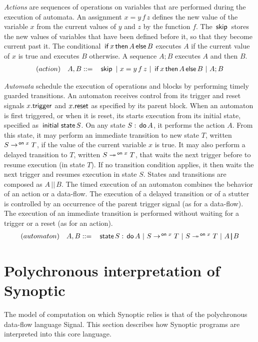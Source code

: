 \documentclass[copyright,creativecommons]{eptcs}
\newcommand{\signal}{{\sc Signal}}
\newcommand{\op}[1]{{\sf #1}}
\newcommand{\kw}[1]{{{\,\op{#1}\,}}}
\newcommand{\Par}{{\,|\!\!|\,}}
\newcommand{\ra}{\rightarrow}
\renewcommand{\:}{{:}}
\newcommand{\Do}{{\kw{do}}}
\newcommand{\Skip}{{\kw{skip}}}
\newcommand{\If}{{\kw{if}}}
\newcommand{\Then}{{\kw{then}}}
\newcommand{\Else}{{\kw{else}}}
\newcommand{\trigger}{{\op{trigger}}}
\newcommand{\reset}{{\op{reset}}}
\newcommand{\rra}{\twoheadrightarrow}
\newcommand{\Init}{{\kw{initial}\kw{state}}}
\newcommand{\On}{{\kw{on}}}
\newcommand{\State}{{\kw{state}}}
\begin{document}
{\em Actions} are sequences of operations on variables that are performed during the execution of automata. An assignment $x=y\,f\,z$ defines the new value of the variable $x$ from the current values of $y$ and $z$ by the function $f$. The $\Skip$  stores the new values of variables that have been defined before it, so that they become current past it.  The conditional $\If x\Then A\Else B$ executes $A$ if the current value of $x$ is true and executes $B$ otherwise. A sequence $A;B$ executes $A$ and then $B$. 
\[
\begin{array}{rl}
(action)\quad A,B::=& \Skip\ |\ x=y\,f\,z\ |\ \If x\Then A\Else B\ |\ A;B
\end{array}
\]

{\em Automata} schedule the execution of operations and blocks by performing timely guarded transitions. An automaton receives control from its trigger and reset signals $x.\trigger$ and $x.\reset$ as specified by its parent block.  When an automaton is first triggered, or when it is reset, its starts execution from its initial state, specified as $\Init S$. On any state $S:\Do A$, it performs the action $A$. From this state, it may perform an immediate transition to new state $T$, written $S\ra^{\On\,x} T$, if the value of the current variable $x$ is true.  It may also perform a delayed transition to $T$, written $S\rra^{\On\,x} T$, that waits the next trigger before to resume execution (in state $T$). If no transition condition applies, it then waits the next trigger and resumes execution in state $S$.  States and transitions are composed as $A\Par B$. The timed execution of an automaton combines the behavior of an action or a data-flow.  The execution of a delayed transition or of a stutter is controlled by an occurrence of the parent trigger signal (as for a data-flow). The execution of an immediate transition is performed without waiting for a trigger or a reset (as for an action).
\[
\begin{array}{rl}
(automaton)\quad A,B::=& \State S:\Do A\ |\ S\ra^{\On\,x} T\ |\ S\rra^{\On\,x} T\ |\ A\Par B
\end{array}
\]

\section{Polychronous interpretation of Synoptic}
\label{Semantics}

The model of computation on which Synoptic relies is that of the polychronous data-flow language \signal. This section describes how Synoptic programs are interpreted into this core language.
\end{document}
